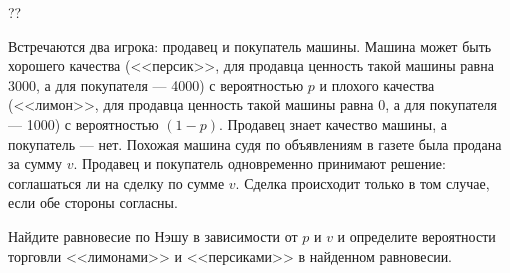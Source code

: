 \begin{problem}\par
\begin{source} \cite{slanthcev:gt}??\end{source}
Встречаются два игрока: продавец и покупатель машины. Машина может быть хорошего качества (<<персик>>, для продавца ценность такой машины равна 3000, а для покупателя --- 4000) с вероятностью  $p$  и плохого качества (<<лимон>>, для продавца ценность такой машины равна 0, а для покупателя --- 1000) с вероятностью  $\left(1-p\right)$. Продавец знает качество машины, а покупатель --- нет. Похожая машина судя по объявлениям в газете была продана за сумму  $v$. Продавец и покупатель одновременно принимают решение: соглашаться ли на сделку по сумме  $v$. Сделка происходит только в том случае, если обе стороны согласны.\par
Найдите равновесие по Нэшу в зависимости от  $p$  и  $v$  и определите вероятности торговли <<лимонами>> и <<персиками>> в найденном равновесии.



\begin{sol}

\end{sol}
\end{problem}



